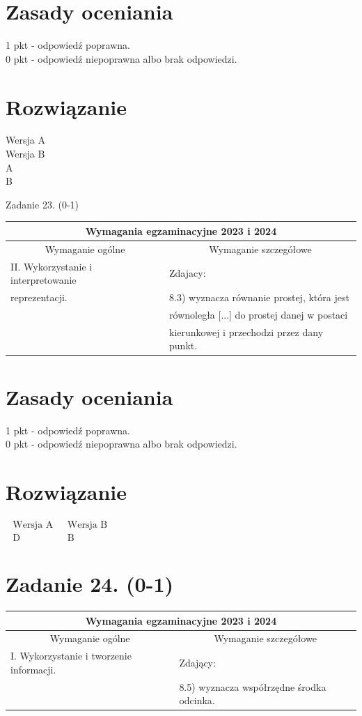 \documentclass[10pt]{article}
\begin{document}
\section*{Zasady oceniania}
1 pkt - odpowiedź poprawna.\\
0 pkt - odpowiedź niepoprawna albo brak odpowiedzi.

\section*{Rozwiązanie}
Wersja A\\
Wersja B\\
A\\
B

Zadanie 23. (0-1)

\begin{center}
\begin{tabular}{|l|l|}
\hline
\multicolumn{2}{|c|}{Wymagania egzaminacyjne 2023 i 2024} \\
\hline
\multicolumn{1}{|c|}{Wymaganie ogólne} & \multicolumn{1}{c|}{Wymaganie szczegółowe} \\
\hline
II. Wykorzystanie i interpretowanie & Zdajacy: \\
reprezentacji. & 8.3) wyznacza równanie prostej, która jest \\
 & równoległa [...] do prostej danej w postaci \\
 & kierunkowej i przechodzi przez dany punkt. \\
\hline
\end{tabular}
\end{center}

\section*{Zasady oceniania}
1 pkt - odpowiedź poprawna.\\
0 pkt - odpowiedź niepoprawna albo brak odpowiedzi.

\section*{Rozwiązanie}
$\begin{array}{ll}\text { Wersja A } & \text { Wersja B } \\ \text { D } & \text { B }\end{array}$

\section*{Zadanie 24. (0-1)}
\begin{center}
\begin{tabular}{|l|l|}
\hline
\multicolumn{2}{|c|}{Wymagania egzaminacyjne 2023 i 2024} \\
\hline
\multicolumn{1}{|c|}{Wymaganie ogólne} & \multicolumn{1}{c|}{Wymaganie szczegółowe} \\
\hline
I. Wykorzystanie i tworzenie informacji. & Zdający: \\
 & 8.5) wyznacza współrzędne środka odcinka. \\
\hline
\end{tabular}
\end{center}
\end{document}
